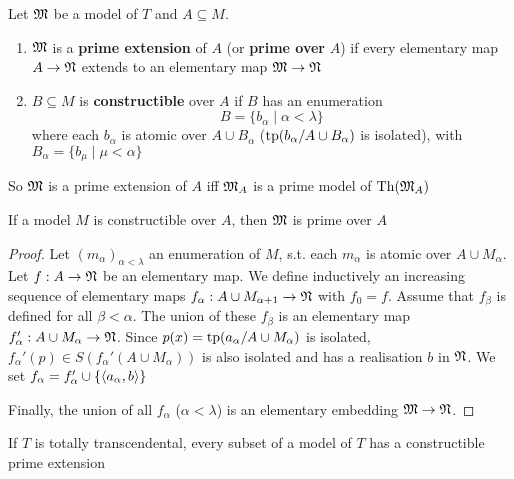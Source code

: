\documentclass[11pt]{article}
\begin{document}
\begin{definition}[]
Let \(\mathfrak{M}\) be a model of \(T\) and \(A\subseteq M\).
\begin{enumerate}
\item \(\mathfrak{M}\) is a \textbf{prime extension} of \(A\) (or \textbf{prime over} \(A\)) if every elementary map \(A\to\mathfrak{N}\)
extends to an elementary map \(\mathfrak{M}\to\mathfrak{N}\)
\begin{center}\end{center}
\item \(B\subseteq M\) is \textbf{constructible} over \(A\) if \(B\) has an enumeration
\begin{equation*}
B=\{b_\alpha\mid\alpha<\lambda\}
\end{equation*}
where each \(b_\alpha\) is atomic over \(A\cup B_\alpha\) (\(\operatorname{tp}(b_\alpha/A\cup B_\alpha)\) is isolated), with \(B_\alpha=\{b_\mu\mid \mu<\alpha\}\)
\end{enumerate}
\end{definition}

So \(\mathfrak{M}\) is a prime extension of \(A\) iff \(\mathfrak{M}_A\) is a prime model of \(\operatorname{Th}(\mathfrak{M}_A)\)

\begin{lemma}[]
\label{lemma5.3.2}
If a model \(M\) is constructible over \(A\), then \(\mathfrak{M}\) is prime over \(A\)
\end{lemma}

\begin{proof}
Let \((m_\alpha)_{\alpha<\lambda}\) an enumeration of \(M\), s.t. each \(m_\alpha\) is atomic over \(A\cup M_\alpha\).
Let \(f:A\to\mathfrak{N}\) be an elementary map. We define inductively an increasing sequence of elementary
maps \(f_\alpha:A\cup M_{\alpha+1}\to\mathfrak{N}\) with \(f_0=f\). Assume that \(f_\beta\) is defined for all \(\beta<\alpha\). The
union of these \(f_\beta\) is an elementary map \(f_\alpha':A\cup M_\alpha\to\mathfrak{N}\). Since \(p(x)=\operatorname{tp}(a_\alpha/A\cup M_\alpha)\) is
isolated, \(f_\alpha'(p)\in S(f_\alpha'(A\cup M_\alpha))\) is also isolated and has a realisation \(b\) in \(\mathfrak{N}\). We
set \(f_\alpha=f_\alpha'\cup\{\langle a_\alpha,b\rangle\}\)

Finally, the union of all \(f_\alpha\) (\(\alpha<\lambda\)) is an elementary embedding \(\mathfrak{M}\to\mathfrak{N}\).
\end{proof}

\begin{theorem}[]
\label{thm5.3.3}
If \(T\) is totally transcendental, every subset of a model of \(T\) has a constructible prime extension
\end{theorem}
\end{document}
